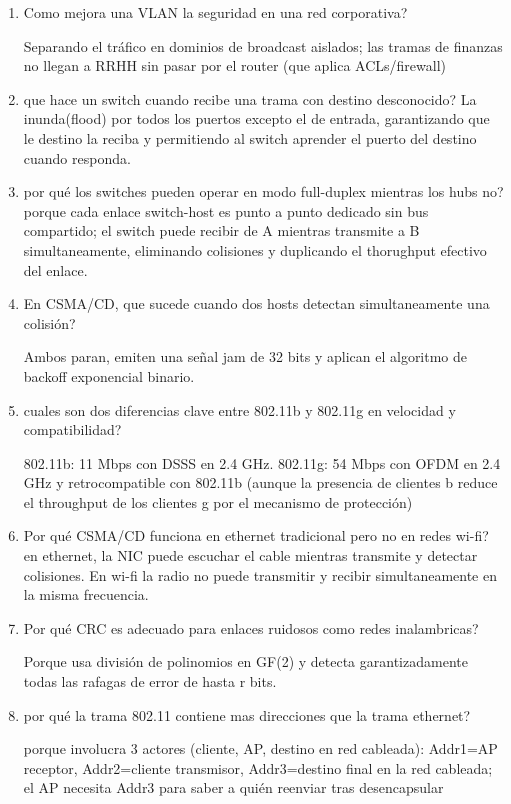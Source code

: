 \begin{enumerate}
\item Como mejora una VLAN la seguridad en una red corporativa?

Separando el tráfico en dominios de broadcast aislados; las tramas de finanzas no llegan a RRHH sin pasar por el router (que aplica ACLs/firewall)

\item que hace un switch cuando recibe una trama con destino desconocido?
La inunda(flood) por todos los puertos excepto el de entrada, garantizando que le destino la reciba y permitiendo al switch aprender el puerto del destino cuando responda.

\item por qué los switches pueden operar en modo full-duplex mientras los hubs no?
porque cada enlace switch-host es punto a punto dedicado sin bus compartido; el switch puede recibir de A mientras transmite a B simultaneamente, eliminando colisiones y duplicando el thorughput efectivo del enlace.

\item En CSMA/CD, que sucede cuando dos hosts detectan simultaneamente una colisión?

Ambos paran, emiten una señal jam de 32 bits y aplican el algoritmo de backoff exponencial binario.

\item cuales son dos diferencias clave entre 802.11b y 802.11g en velocidad y compatibilidad?

802.11b: 11 Mbps con DSSS en 2.4 GHz. 802.11g: 54 Mbps con OFDM en 2.4 GHz y retrocompatible con 802.11b (aunque la presencia de clientes b reduce el throughput de los clientes g por el mecanismo de protección)

\item Por qué CSMA/CD funciona en ethernet tradicional pero no en redes wi-fi?
en ethernet, la NIC puede escuchar el cable mientras transmite y detectar colisiones. En wi-fi la radio no puede transmitir y recibir simultaneamente en la misma frecuencia.

\item Por qué CRC es adecuado para enlaces ruidosos como redes inalambricas?

Porque usa división de polinomios en GF(2) y detecta garantizadamente todas las rafagas de error de hasta r bits.

\item por qué la trama 802.11 contiene mas direcciones que la trama ethernet?

porque involucra 3 actores (cliente, AP, destino en red cableada): Addr1=AP receptor, Addr2=cliente transmisor, Addr3=destino final en la red cableada; el AP necesita Addr3 para saber a quién reenviar tras desencapsular


\end{enumerate}

